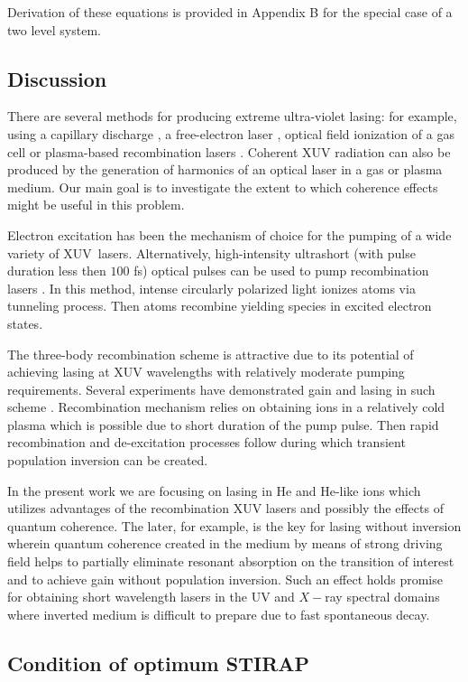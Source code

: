 Derivation of these equations is provided in Appendix B for the special case
of a two level system.

\subsection{Discussion}

There are several methods for producing extreme ultra-violet lasing: for
example, using a capillary discharge \cite{Rocc94}, a free-electron laser
\cite{Milt01}, optical field ionization of a gas cell \cite{Lemo95} or
plasma-based recombination lasers \cite{Suck85}. Coherent XUV radiation can
also be produced by the generation of harmonics of an optical laser in a gas
or plasma medium. Our main goal is to investigate the extent to which
coherence effects might be useful in this problem.

Electron excitation has been the mechanism of choice for the pumping of a
wide variety of XUV\ lasers. Alternatively, high-intensity ultrashort (with
pulse duration less then $100$ fs) optical pulses can be used to pump
recombination lasers \cite{Burn89}. In this method, intense circularly
polarized light ionizes atoms via tunneling process. Then atoms recombine
yielding species in excited electron states.

The three-body recombination scheme is attractive due to its potential of
achieving lasing at XUV wavelengths with relatively moderate pumping
requirements. Several experiments have demonstrated gain and lasing in such
scheme \cite{Naga93,Krus96,Koro96}. Recombination mechanism relies on
obtaining ions in a relatively cold plasma which is possible due to short
duration of the pump pulse. Then rapid recombination and de-excitation
processes follow during which transient population inversion can be created.

In the present work we are focusing on lasing in He and He-like ions which
utilizes advantages of the recombination XUV lasers and possibly the effects
of quantum coherence. The later, for example, is the key for lasing without
inversion wherein quantum coherence created in the medium by means of strong
driving field helps to partially eliminate resonant absorption on the
transition of interest and to achieve gain without population inversion.
Such an effect holds promise for obtaining short wavelength lasers in the UV
and $X-$ray spectral domains where inverted medium is difficult to prepare
due to fast spontaneous decay.

\subsection{Condition of optimum STIRAP}

